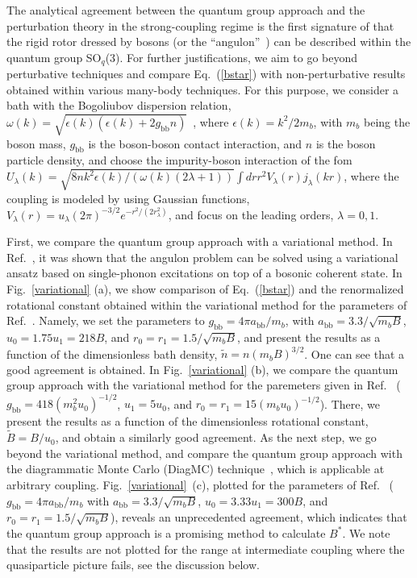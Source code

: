 \documentclass[aps,prl,reprint,showpacs,floatfix]{revtex4-1}
\begin{document}
The analytical agreement between the quantum group approach and the perturbation theory in the strong-coupling regime is the first signature of that the rigid rotor dressed by bosons (or the ``angulon''~\cite{Lemeshko_2016_book}) can be described within the quantum group SO$_q$(3). For further justifications, we aim to go beyond perturbative techniques and compare Eq.~(\ref{bstar}) with  non-perturbative results obtained within various many-body techniques.  For this purpose, we consider a bath with the Bogoliubov dispersion relation, $\omega (k) = \sqrt{\epsilon (k) (\epsilon (k) + 2 g_{\text{bb}} n)}$~\cite{Pitaevskii2016}, where $\epsilon(k) = k^2/2m_b$, with $m_b$ being the boson mass,
$g_\text{bb}$ is the boson-boson contact interaction, and $n$ is the boson particle density, and choose the impurity-boson interaction of the fom $U_\lambda (k) = \sqrt{8 n k^2 \epsilon (k) /(\omega (k) (2\lambda+1))} \int dr r^2 V_\lambda (r) j_\lambda (k r)$, where the coupling is modeled by using Gaussian functions, $V_\lambda (r) =  u_\lambda (2\pi)^{-3/2} e^{-r^2/(2 r_\lambda^2)}$, and focus on the leading orders, $\lambda =0,1$.


First, we compare the quantum group approach with a variational method. In Ref.~\cite{PhysRevX.6.011012}, it was shown that the angulon problem can be solved using a variational ansatz based on single-phonon excitations on top of a bosonic coherent state. In Fig.~\ref{variational} (a), we show comparison
of Eq.~(\ref{bstar}) and the renormalized rotational constant obtained within the variational method for the parameters of Ref.~\cite{Lemeshko_2015}.  Namely, we set the parameters to $g_{\text{bb}} = 4\pi a_{\text{bb}}/m_b$, with $a_{\text{bb}} = 3.3 /\sqrt{m_b B}$, $u_0 = 1.75 u_1 = 218 B$, and $r_0 = r_1 = 1.5 /\sqrt{m_b B}$, and present the results as a function of the dimensionless bath density, $\tilde{n} = n (m_b B)^{3/2} $. One can see that a good agreement is obtained. In Fig.~\ref{variational} (b), we compare the quantum group approach with the variational method for the paremeters given in Ref.~\cite{PhysRevX.6.011012} ($g_\text{bb} = 418 (m_b^2 u_0)^{-1/2}$, $u_1 = 5 u_0$, and $r_0 = r_1 = 15 (m_b u_0)^{-1/2}$). There, we present the results  as a function of the dimensionless rotational constant, $\tilde{B} = B/u_0$, and obtain a similarly good agreement.  As the next step, we go beyond the variational method, and compare the quantum group approach with the diagrammatic Monte Carlo (DiagMC) technique~\cite{bighin2018diagrammatic}, which is applicable at arbitrary coupling. Fig.~\ref{variational}~(c), plotted for the parameters of  Ref.~\cite{bighin2018diagrammatic} ($g_{\text{bb}} = 4\pi a_{\text{bb}}/m_b$ with $a_{\text{bb}} = 3.3 /\sqrt{m_b B}$, $u_0 = 3.33 u_1 = 300 B$, and $r_0 = r_1 = 1.5 /\sqrt{m_b B}$), reveals an unprecedented agreement, which indicates that the quantum group approach is a promising method to calculate $B^*$. We note that the results are not plotted for the range at intermediate coupling where the quasiparticle picture fails, see the discussion below. 
\end{document}
